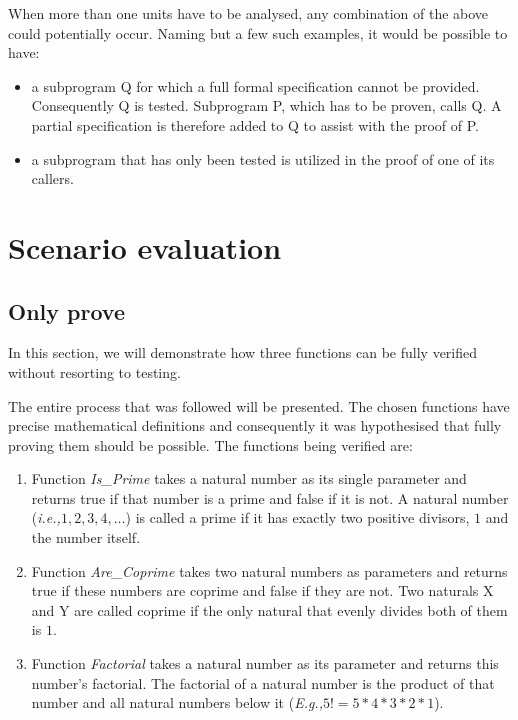 \documentclass{llncs}
\newcommand{\ie}{\textit{i.e.,}\xspace}
\newcommand{\Eg}{\textit{E.g.,}\xspace}
\begin{document}
When more than one units have to be analysed, any combination of the
above could potentially occur. Naming but a few such examples, it
would be possible to have:
\begin{itemize}
\item a subprogram Q for which a full formal specification cannot be
  provided. Consequently Q is tested. Subprogram P, which has to be
  proven, calls Q. A partial specification is therefore added to Q to
  assist with the proof of P.

\item a subprogram that has only been tested is utilized in the proof
  of one of its callers.
\end{itemize}



\section{Scenario evaluation}

\subsection{Only prove}
In this section, we will demonstrate how three functions can be fully
verified without resorting to testing.

The entire
process that was followed will be presented. The chosen functions have
precise mathematical definitions and consequently it was hypothesised
that fully proving them should be possible. The functions being 
verified are:
\begin{enumerate}
\item Function \emph{Is\_Prime} takes a natural number as its single
  parameter and returns true if that number is a prime and false if it
  is not. A natural number (\ie $1, 2, 3, 4, \dots$) is called a prime
  if it has exactly two positive divisors, $1$ and the number itself.

\item Function \emph{Are\_Coprime} takes two natural numbers as
  parameters and returns true if these numbers are coprime and false
  if they are not. Two naturals X and Y are called coprime if the only
  natural that evenly divides both of them is $1$.

\item Function \emph{Factorial} takes a natural number as its
  parameter and returns this number's factorial. The factorial of a
  natural number is the product of that number and all natural numbers
  below it (\Eg $5! = 5 * 4 * 3 * 2 * 1$).
\end{enumerate}
\end{document}
